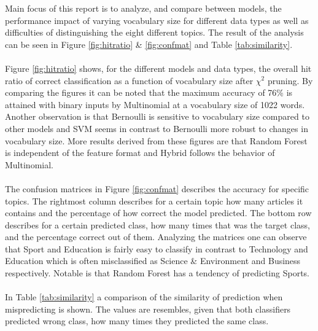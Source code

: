 Main focus of this report is to analyze, and compare between models, the performance impact of varying vocabulary size for different data types as well as difficulties of distinguishing the eight different topics. The result of the analysis can be seen in Figure \ref{fig:hitratio} \& \ref{fig:confmat} and Table \ref{tab:similarity}.\\\\
Figure \ref{fig:hitratio} shows, for the different models and data types, the overall hit ratio of correct classification as a function of vocabulary size after $\chi^2$ pruning. By comparing the figures it can be noted that the maximum accuracy of 76\% is attained with binary inputs by Multinomial at a vocabulary size of 1022 words. Another observation is that Bernoulli is sensitive to vocabulary size compared to other models and SVM seems in contrast to Bernoulli more robust to changes in vocabulary size. More results derived from these figures are that Random Forest is independent of the feature format and Hybrid follows the behavior of Multinomial.\\\\
The confusion matrices in Figure \ref{fig:confmat} describes the accuracy for specific topics. The rightmost column describes for a certain topic how many articles it contains and the percentage of how correct the model predicted. The bottom row describes for a certain predicted class, how many times that was the target class, and the percentage correct out of them. Analyzing the matrices one can observe that Sport and Education is fairly easy to classify in contrast to Technology and Education which is often misclassified as Science \& Environment and Business respectively. Notable is that Random Forest has a tendency of predicting Sports.\\\\
In Table \ref{tab:similarity} a comparison of the similarity of prediction when mispredicting is shown. The values are resembles, given that both classifiers predicted wrong class, how many times they predicted the same class.

\onecolumn

\onecolumn

\twocolumn
